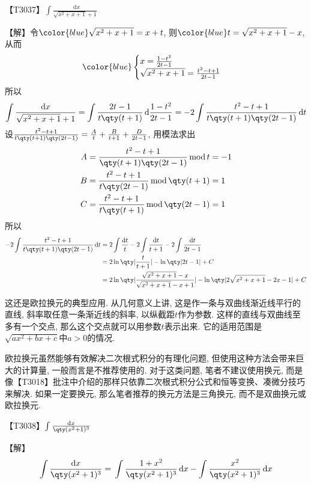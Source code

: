 \documentclass{ctexbook}
\newcommand*{\dif}{\mathop{}\!\mathrm{d}}
\newcommand{\m}{\,\mathrm{mod}\,}
\begin{document}
{【T3037】$\int\frac{\dif{x}}{\sqrt{x^{2}+x+1}+1}$\par
【解】令$\color{blue}\sqrt{x^{2}+x+1}=x+t$, 则$\color{blue}t=\sqrt{x^{2}+x+1}-x$, 从而
\begin{align*}\color{blue}
\begin{cases}
x=\frac{1-t^{2}}{2t-1}\\
\sqrt{x^{2}+x+1}=\frac{t^{2}-t+1}{2t-1}
\end{cases}
\end{align*}
所以
\begin{align*}
\int\frac{\dif{x}}{\sqrt{x^{2}+x+1}+1}=\int\frac{2t-1}{t\qty(t+1)}\dif{\frac{1-t^{2}}{2t-1}}=-2\int\frac{t^{2}-t+1}{t\qty(t+1)\qty(2t-1)}\dif{t}
\end{align*}
设$\frac{t^{2}-t+1}{t\qty(t+1)\qty(2t-1)}=\frac{A}{t}+\frac{B}{t+1}+\frac{D}{2t-1}$, 用模法求出
\begin{align*}
A={}&\frac{t^{2}-t+1}{\qty(t+1)\qty(2t-1)}\m t=-1\\
B={}&\frac{t^{2}-t+1}{t\qty(2t-1)}\m\qty(t+1)=1\\
C={}&\frac{t^{2}-t+1}{t\qty(t+1)}\m\qty(2t-1)=1
\end{align*}
所以
\begin{align*}
-2\int\frac{t^{2}-t+1}{t\qty(t+1)\qty(2t-1)}\dif{t}={}&2\int\frac{\dif{t}}{t}-2\int\frac{\dif{t}}{t+1}-2\int\frac{\dif{t}}{2t-1}\\
={}&2\ln\qty|\frac{t}{t+1}|-\ln\qty|2t-1|+C\\
={}&2\ln\qty|\frac{\sqrt{x^{2}+x+1}-x}{\sqrt{x^{2}+x+1}-x+1}|-\ln\qty|2\sqrt{x^{2}+x+1}-2x-1|+C
\end{align*}\par
{\kaishu 这还是欧拉换元的典型应用. 从几何意义上讲, 这是作一条与双曲线渐近线平行的直线, 斜率取任意一条渐近线的斜率, 以纵截距$t$作为参数. 这样的直线与双曲线至多有一个交点, 那么这个交点就可以用参数$t$表示出来. 它的适用范围是$\sqrt{ax^{2}+bx+c}$中$a>0$的情况. \par
欧拉换元虽然能够有效解决二次根式积分的有理化问题, 但使用这种方法会带来巨大的计算量, 一般而言是不推荐使用的. 对于这类问题, 笔者不建议使用换元, 而是像{\color{red}【T3018】}批注中介绍的那样只依靠二次根式积分公式和恒等变换、凑微分技巧来解决. 如果一定要换元, 那么笔者推荐的换元方法是三角换元, 而不是双曲换元或欧拉换元. \par}
{\color{red}【T3038】}$\int\frac{\dif{x}}{\qty(x^{2}+1)^{3}}$\par
【解】
\begin{align*}
\int\frac{\dif{x}}{\qty(x^{2}+1)^{3}}={}&\int\frac{1+x^{2}}{\qty(x^{2}+1)^{3}}\dif{x}-\int\frac{x^{2}}{\qty(x^{2}+1)^{3}}\dif{x}\\

\end{align*}}
\end{document}
